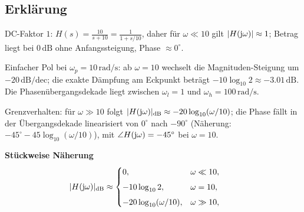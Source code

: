 \subsection{Erklärung}
\vspace{5mm}
\begin{description}[leftmargin=1.2em,labelsep=.6em,font=\bfseries]
\item[Schritt 1] DC-Faktor $1$: $H(s)=\frac{10}{s+10}=\frac{1}{1+s/10}$, daher für $\omega\ll10$ gilt $|H(\operatorname{j}\!\omega)|\approx1$; Betrag liegt bei $0\,\mathrm{dB}$ ohne Anfangssteigung, Phase $\approx0^\circ$.
\item[Schritt 2] Einfacher Pol bei $\omega_p=10\,\mathrm{rad/s}$: ab $\omega=10$ wechselt die Magnituden-Steigung um $-20\,\mathrm{dB/dec}$; die exakte Dämpfung am Eckpunkt beträgt $-10\log_{10}2\approx-3.01\,\mathrm{dB}$. Die Phasenübergangsdekade liegt zwischen $\omega_l=1$ und $\omega_h=100\,\mathrm{rad/s}$.
\item[Schritt 3] Grenzverhalten: für $\omega\gg10$ folgt $|H(\operatorname{j}\!\omega)|_{\mathrm{dB}}\approx-20\log_{10}(\omega/10)$; die Phase fällt in der Übergangsdekade linearisiert von $0^\circ$ nach $-90^\circ$ (Näherung: $-45^\circ-45\log_{10}(\omega/10)$), mit $\angle H(\operatorname{j}\!\omega)=-45^\circ$ bei $\omega=10$.
\end{description}

\vspace{0.5cm}
\medskip
\noindent\textbf{Stückweise Näherung}
\[
|H(\operatorname{j}\!\omega)|_{\mathrm{dB}}\approx
\begin{cases}
0,& \omega\ll10,\\[4pt]
-10\log_{10}2,& \omega=10,\\[4pt]
-20\log_{10}(\omega/10),& \omega\gg10,
\end{cases}
\qquad
\]
\newpage